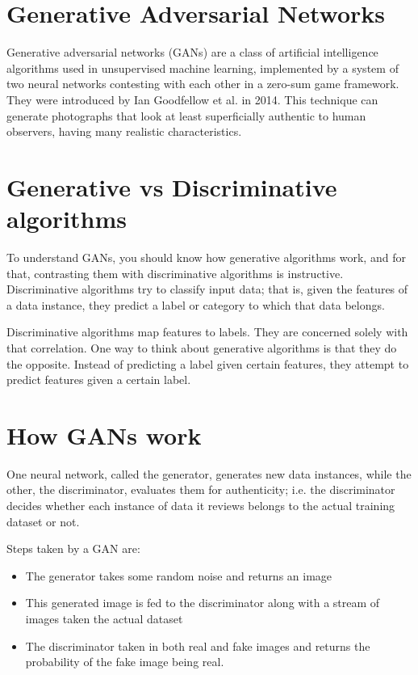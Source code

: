 \section{Generative Adversarial Networks}
Generative adversarial networks (GANs) are a class of artificial intelligence 
algorithms used in unsupervised machine learning, implemented by a system of 
two neural networks contesting with each other in a zero-sum game framework. 
They were introduced by Ian Goodfellow et al. in 2014\cite{base}. This technique 
can generate photographs that look at least superficially authentic to human 
observers, having many realistic characteristics.\cite{improvedtechniques}

\section{Generative vs Discriminative algorithms}
To understand GANs, you should know how generative algorithms work, and for 
that, contrasting them with discriminative algorithms is instructive. 
Discriminative algorithms try to classify input data; that is, given the 
features of a data instance, they predict a label or category to which that 
data belongs.


Discriminative algorithms map features to labels. They are concerned solely 
with that correlation. One way to think about generative algorithms is that 
they do the opposite. Instead of predicting a label given certain features, 
they attempt to predict features given a certain label.

\section{How GANs work}

One neural network, called the generator, generates new data instances, while 
the other, the discriminator, evaluates them for authenticity; i.e. the 
discriminator decides whether each instance of data it reviews belongs to the 
actual training dataset or not.\cite{fourj}

Steps taken by a GAN are:
\begin{itemize}
  \item{The generator takes some random noise and returns an image}
  \item{This generated image is fed to the discriminator along with a stream of 
  images taken the actual dataset}
  \item{The discriminator taken in both real and fake images and returns the 
  probability of the fake image being real.}
\end{itemize}
